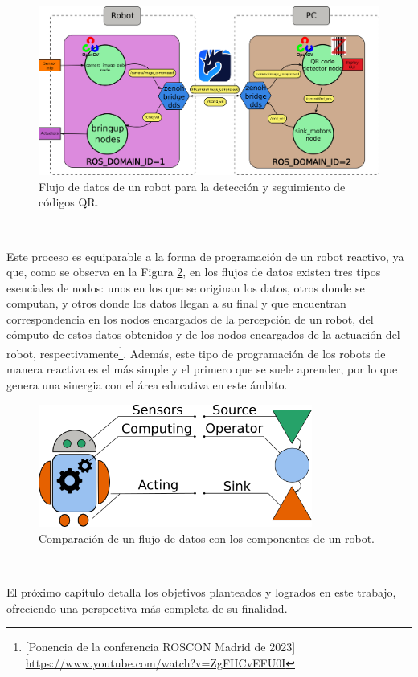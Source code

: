 \begin{figure} [h!]
  \begin{center}
    \includegraphics[width=15cm]{figs/QR_code_data_flow}
  \end{center}
  \caption{Flujo de datos de un robot para la detección y seguimiento de códigos QR.}
  \label{fig:data_flow_qr_example}
\end{figure}\

Este proceso es equiparable a la forma de programación de un robot reactivo, ya
que, como se observa en la Figura \ref{fig:data_flow_vs_robotics}, en los flujos
de datos existen tres tipos esenciales de nodos: unos en los que se originan los
datos, otros donde se computan, y otros donde los datos llegan a su final y que
encuentran correspondencia en los nodos encargados de la percepción de un robot,
del cómputo de estos datos obtenidos y de los nodos encargados de la actuación
del robot, respectivamente\footnote{[Ponencia de la conferencia ROSCON Madrid de
2023] \url{https://www.youtube.com/watch?v=ZgFHCvEFU0I}}.
Además, este tipo de programación de los robots de manera reactiva es el más
simple y el primero que se suele aprender, por lo que genera una sinergia con el
área educativa en este ámbito.

\begin{figure} [h!]
  \begin{center}
    \includegraphics[width=9cm]{figs/data-flow_vs_robotics_scheme}
  \end{center}
  \caption{Comparación de un flujo de datos con los componentes de un robot.}
  \label{fig:data_flow_vs_robotics}
\end{figure}\




El próximo capítulo detalla los objetivos planteados y logrados en este trabajo,
ofreciendo una perspectiva más completa de su finalidad.
